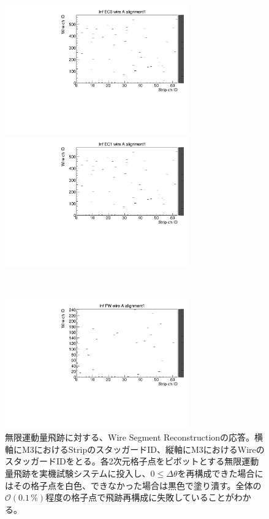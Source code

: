 \begin{figure}
    \begin{minipage}[b]{.5\linewidth}
        \centering
        \includegraphics[height=5.6cm]{fig/Test/A_InfEC0_wire.pdf}
    \end{minipage}
    \begin{minipage}[b]{.5\linewidth}
        \centering
        \includegraphics[height=5.6cm]{fig/Test/A_InfEC1_wire.pdf}
    \end{minipage}\\
    \begin{minipage}[b]{\linewidth}
        \centering
        \includegraphics[height=5.6cm]{fig/Test/A_InfFW_wire.pdf}
    \end{minipage}
    \caption[無限運動量飛跡に対する、Wire Segment Reconstructionの応答]{無限運動量飛跡に対する、Wire Segment Reconstructionの応答。横軸にM3におけるStripのスタッガードID、縦軸にM3におけるWireのスタッガードIDをとる。各2次元格子点をピボットとする無限運動量飛跡を実機試験システムに投入し、$0 \leq \Delta\theta$を再構成できた場合にはその格子点を白色、できなかった場合は黒色で塗り潰す。全体の$\mathcal{O}(0.1\,\%)$程度の格子点で飛跡再構成に失敗していることがわかる。}
    \label{Inf_A_Wire}
\end{figure}


